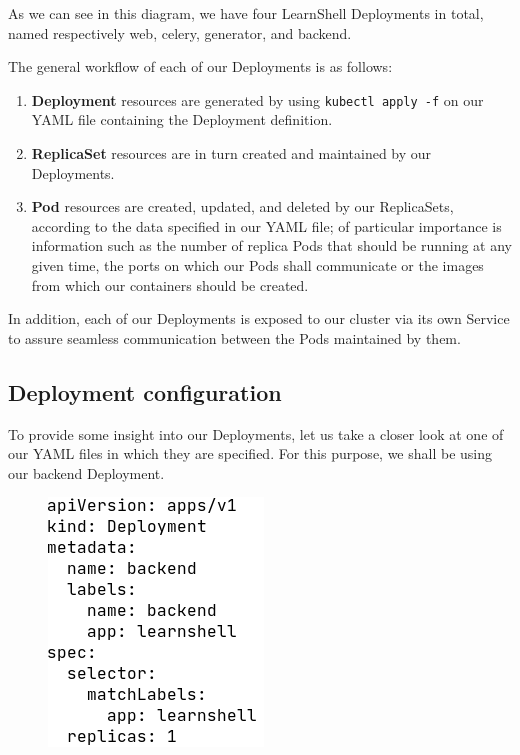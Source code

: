 \documentclass[thesis=B,english]{FITthesis}[2019/12/23]
\begin{document}
As we can see in this diagram, we have four LearnShell Deployments in total, named respectively web, celery, generator, and backend.

The general workflow of each of our Deployments is as follows:

\begin{enumerate}
  \setlength\itemsep{0em}
  \item \textbf{Deployment} resources are generated by using \verb|kubectl apply -f| on our YAML file containing the Deployment definition.
  \item \textbf{ReplicaSet} resources are in turn created and maintained by our Deployments.
  \item \textbf{Pod} resources are created, updated, and deleted by our ReplicaSets, according to the data specified in our YAML file; of particular importance is information such as the number of replica Pods that should be running at any given time, the ports on which our Pods shall communicate or the images from which our containers should be created.
\end{enumerate}

In addition, each of our Deployments is exposed to our cluster via its own Service to assure seamless communication between the Pods maintained by them.

\subsection{Deployment configuration}

To provide some insight into our Deployments, let us take a closer look at one of our YAML files in which they are specified. For this purpose, we shall be using our backend Deployment.

\begin{figure}[H]
\centering
\hspace*{-0.5cm}
\includegraphics[scale=0.5]{deploy-backend1}
\end{figure}
\end{document}
